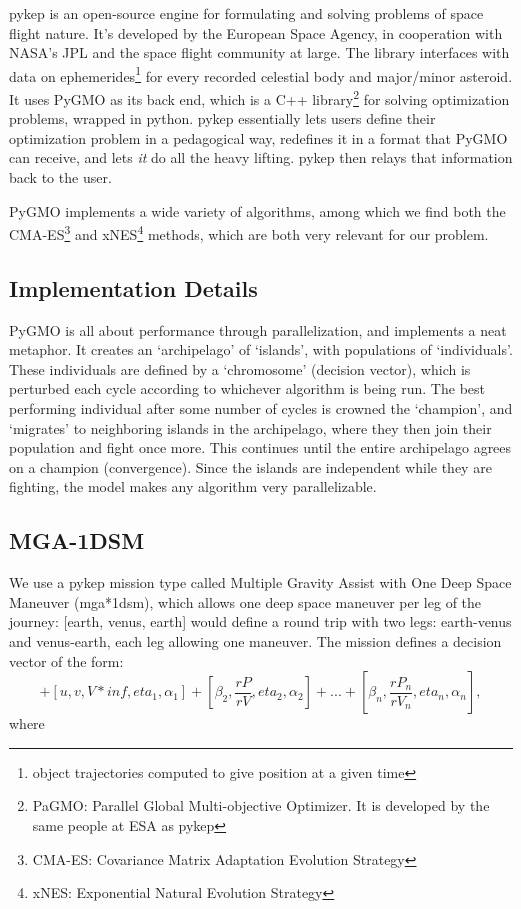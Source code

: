 pykep is an open-source engine for formulating and solving problems of space flight nature. It's developed by the European Space Agency, in cooperation with NASA's JPL and the space flight community at large. The library interfaces with data on ephemerides\footnote{object trajectories computed to give position at a given time} for every recorded celestial body and major/minor asteroid. It uses PyGMO as its back end, which is a C++ library\footnote{PaGMO: Parallel Global Multi-objective Optimizer. It is developed by the same people at ESA as pykep} for solving optimization problems, wrapped in python. pykep essentially lets users define their optimization problem in a pedagogical way, redefines it in a format that PyGMO can receive, and lets \emph{it} do all the heavy lifting. pykep then relays that information back to the user.

PyGMO implements a wide variety of algorithms, among which we find both the CMA-ES\footnote{CMA-ES: Covariance Matrix Adaptation Evolution Strategy} and xNES\footnote{xNES: Exponential Natural Evolution Strategy} methods, which are both very relevant for our problem.

\subsection{Implementation Details} 

PyGMO is all about performance through parallelization, and implements a neat metaphor. It creates an `archipelago' of `islands', with populations of `individuals'. These individuals are defined by a `chromosome' (decision vector), which is perturbed each cycle according to whichever algorithm is being run. The best performing individual after some number of cycles is crowned the `champion', and `migrates' to neighboring islands in the archipelago, where they then join their population and fight once more. This continues until the entire archipelago agrees on a champion (convergence). Since the islands are independent while they are fighting, the model makes any algorithm very parallelizable.

\subsection{MGA-1DSM }
We use a pykep mission type called Multiple Gravity Assist with One Deep Space Maneuver (mga*1dsm), which allows one deep space maneuver per leg of the journey: [earth, venus, earth] would define a round trip with two legs: earth-venus and venus-earth, each leg allowing one maneuver. The mission defines a decision vector of the form:
\begin{equation}
    [t0, T]+[u,v,V*{inf},eta_1, \alpha_1] + [\beta_2, \frac{rP}{rV},eta_2,\alpha_2]+ ... +[\beta_n,\frac{rP_n}{rV_n},eta_n,\alpha_n] ,
\end{equation}
where 

